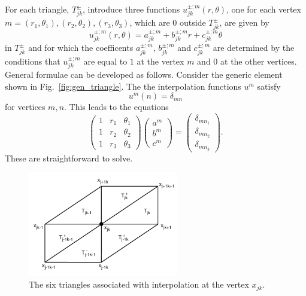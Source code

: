 \noindent For each triangle, $T^{\pm}_{jk}$, introduce three functions $u_{jk}^{\pm;m}(r,\theta)$, one for each vertex $m=(r_1,\theta_1),(r_2,\theta_2),(r_3,\theta_3)$, which are $0$ outside $T^{\pm}_{jk}$, are given by  
\[
u_{jk}^{\pm;m}(r,\theta)=a_{jk}^{\pm;m}+b_{jk}^{\pm;m}r+c_{jk}^{\pm;m}\theta
\] 
in $T^{\pm}_{jk}$ and for which the coefficents $a_{jk}^{\pm;m}$, $b_{jk}^{\pm;m}$ and $c_{jk}^{\pm;m}$ are determined by the conditions that $u_{jk}^{\pm;m}$ are equal to $1$ at the vertex $m$ and $0$ at the other vertices. General formulae can be developed as follows. Consider the generic element shown in Fig.\, \ref{fig:gen_triangle}. The the interpolation functions $u^m$ satisfy 
\[
u^m(n)=\delta_{mn}
\]
for vertices $m,n$. This leads to the equations 
\[
\begin{pmatrix}
1 & r_1 & \theta_1 \\
1 & r_2 & \theta_2 \\
1 & r_3 & \theta_3 
\end{pmatrix}
\begin{pmatrix}
a^m\\b^m\\c^m
\end{pmatrix}
=
\begin{pmatrix}
\delta_{mn_1}\\\delta_{mn_2}\\\delta_{mn_3}
\end{pmatrix}.
\]
These are straightforward to solve. 

\begin{figure}[h]
  \centering
  \includegraphics[height=130pt]{figures/ground_triangles_interp.pdf}
  \caption{The six triangles associated with interpolation at the vertex $x_{jk}$.}
  \label{fig:int_triangles}
\end{figure}

